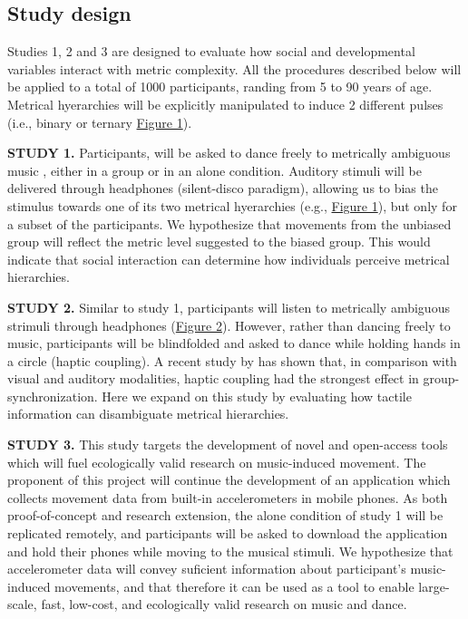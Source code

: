 \documentclass[16pt]{article}
\begin{document}
\subsection{Study design}
Studies 1, 2 and 3 are designed to evaluate how social and developmental variables interact with metric complexity. All the procedures described below will be applied to a total of 1000 participants, randing from 5 to 90 years of age. Metrical hyerarchies will be explicitly manipulated to induce 2 different pulses (i.e., binary or ternary \hyperref[fig:fig1]{Figure 1}).

\textbf{STUDY 1.} Participants, will be asked to dance freely to metrically ambiguous music \cite{phillips2005feeling, phillips2007hearing}, either in a group or in an alone condition. Auditory stimuli will be delivered through headphones (silent-disco paradigm), allowing us to bias the stimulus towards one of its two metrical hyerarchies (e.g., \hyperref[fig:fig1]{Figure 1}), but only for a subset of the participants. We hypothesize that movements from the unbiased group will reflect the metric level suggested to the biased group. This would indicate that social interaction can determine how individuals perceive metrical hierarchies.

\textbf{STUDY 2.} Similar to study 1, participants will listen to metrically ambiguous strimuli through headphones (\hyperref[fig:fig2]{Figure 2}). However, rather than dancing freely to music, participants will be blindfolded and asked to dance while holding hands in a circle (haptic coupling). A recent study by  has shown that, in comparison with visual and auditory modalities, haptic coupling had the strongest effect in group-synchronization. Here we expand on this study by evaluating how tactile information can disambiguate metrical hierarchies.

\textbf{STUDY 3.} This study targets the development of novel and open-access tools which will fuel ecologically valid research on music-induced movement. The proponent of this project will continue the development of an application which collects movement data from built-in accelerometers in mobile phones. As both proof-of-concept and research extension, the alone condition of study 1 will be replicated remotely, and participants will be asked to download the application and hold their phones while moving to the musical stimuli. We hypothesize that accelerometer data will convey suficient information about participant's music-induced movements, and that therefore it can be used as a tool to enable large-scale, fast, low-cost, and ecologically valid research on music and dance.
\end{document}
